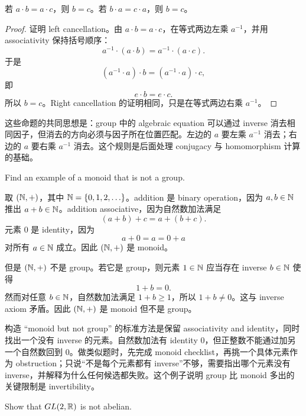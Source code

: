 \begin{proposition}
若 \(a\cdot b=a\cdot c\)，则 \(b=c\)。若 \(b\cdot a=c\cdot a\)，则 \(b=c\)。
\end{proposition}

\begin{proof}
证明 left cancellation。由 \(a\cdot b=a\cdot c\)，在等式两边左乘 \(a^{-1}\)，并用 associativity 保持括号顺序：
\[
  a^{-1}\cdot(a\cdot b)=a^{-1}\cdot(a\cdot c).
\]
于是
\[
  (a^{-1}\cdot a)\cdot b=(a^{-1}\cdot a)\cdot c,
\]
即
\[
  e\cdot b=e\cdot c.
\]
所以 \(b=c\)。Right cancellation 的证明相同，只是在等式两边右乘 \(a^{-1}\)。
\end{proof}

这些命题的共同思想是：group 中的 algebraic equation 可以通过 inverse 消去相同因子，但消去的方向必须与因子所在位置匹配。左边的 \(a\) 要左乘 \(a^{-1}\) 消去；右边的 \(a\) 要右乘 \(a^{-1}\) 消去。这个规则是后面处理 conjugacy 与 homomorphism 计算的基础。

\begin{exerciseblock}
Find an example of a monoid that is not a group.
\end{exerciseblock}

\begin{solution}
取 \((\mathbb{N},+)\)，其中 \(\mathbb{N}=\{0,1,2,\ldots\}\)。addition 是 binary operation，因为 \(a,b\in\mathbb{N}\) 推出 \(a+b\in\mathbb{N}\)。addition associative，因为自然数加法满足
\[
  (a+b)+c=a+(b+c).
\]
元素 \(0\) 是 identity，因为
\[
  a+0=a=0+a
\]
对所有 \(a\in\mathbb{N}\) 成立。因此 \((\mathbb{N},+)\) 是 monoid。

但是 \((\mathbb{N},+)\) 不是 group。若它是 group，则元素 \(1\in\mathbb{N}\) 应当存在 inverse \(b\in\mathbb{N}\) 使得
\[
  1+b=0.
\]
然而对任意 \(b\in\mathbb{N}\)，自然数加法满足 \(1+b\ge 1\)，所以 \(1+b\neq0\)。这与 inverse axiom 矛盾。因此 \((\mathbb{N},+)\) 是 monoid 但不是 group。
\end{solution}

\begin{explanation}
构造 “monoid but not group” 的标准方法是保留 associativity and identity，同时找出一个没有 inverse 的元素。自然数加法有 identity \(0\)，但正整数不能通过加另一个自然数回到 \(0\)。做类似题时，先完成 monoid checklist，再挑一个具体元素作为 obstruction；只说“不是每个元素都有 inverse”不够，需要指出哪个元素没有 inverse，并解释为什么任何候选都失败。这个例子说明 group 比 monoid 多出的关键限制是 invertibility。
\end{explanation}

\begin{exerciseblock}
Show that \(GL(2,\mathbb{R})\) is not abelian.
\end{exerciseblock}

